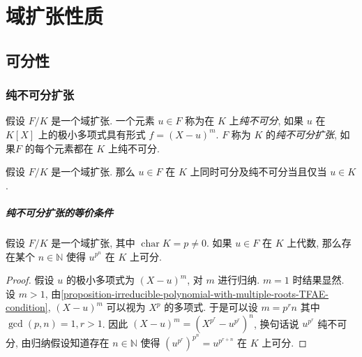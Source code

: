 \chapter{域扩张性质}

\section{可分性}

\subsection{纯不可分扩张}

假设 \( F/K \) 是一个域扩张.
一个元素 \( u \in F \) 称为在 \( K \) 上\emph{纯不可分}, 如果 \( u \) 在 \( K[X]
\) 上的极小多项式具有形式 \( f = (X - u)^m \).
\( F \) 称为 \( K \) 的\emph{纯不可分扩张}, 如果\( F \) 的每个元素都在 \( K \)
上纯不可分.

\begin{proposition}
  \label{proposition-both-separable-purely-inseparable}
  假设 \( F/K \) 是一个域扩张.
  那么 \( u \in F \) 在 \( K \) 上同时可分及纯不可分当且仅当 \( u \in K \).
\end{proposition}

\paragraph{纯不可分扩张的等价条件}

\begin{lemma}
  \label{lemma-power-of-element-separable}
  假设 \( F/K \) 是一个域扩张, 其中 \( \operatorname{char} K = p \neq 0 \).
  如果 \( u \in F \) 在 \( K \) 上代数, 那么存在某个 \( n \in \mathbb{N} \) 使得
  \( u^{p^n} \) 在 \( K \) 上可分.
\end{lemma}
\begin{proof}
  假设 \( u \) 的极小多项式为 \( (X - u)^m \), 对 \( m \) 进行归纳.
  \( m = 1 \) 时结果显然.
  设 \( m > 1 \),
  由\cref{proposition-irreducible-polynomial-with-multiple-roots-TFAE-condition},
  \( (X - u)^m \) 可以视为 \( X^p \) 的多项式.
  于是可以设 \( m = p^r n \) 其中 \( \gcd(p, n) = 1, r > 1 \).
  因此 \( (X - u)^m = (X^{p^r} - u^{p^r})^n \), 换句话说 \( u^{p^r} \) 纯不可分,
  由归纳假设知道存在 \( n \in \mathbb{N} \) 使得 \( (u^{p^r})^{p^n} = u^{p^{r +
  n}} \) 在 \( K \) 上可分.
\end{proof}


